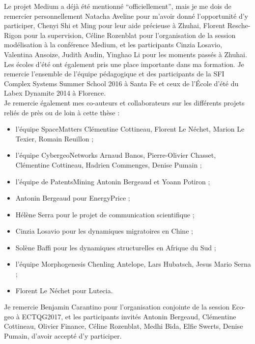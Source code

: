 Le projet Medium a déjà été mentionné ``officiellement'', mais je me dois de remercier personnellement Natacha Aveline pour m'avoir donné l'opportunité d'y participer, Chenyi Shi et Ming pour leur aide précieuse à Zhuhai, Florent Resche-Rigon pour la supervision, Céline Rozenblat pour l'organisation de la session modélisation à la conférence Medium, et les participants Cinzia Losavio, Valentina Ansoize, Judith Audin, Yinghao Li pour les moments passés à Zhuhai.\\



Les écoles d'été ont également pris une place importante dans ma formation. Je remercie l'ensemble de l'équipe pédagogique et des participants de la SFI Complex Systems Summer School 2016 à Santa Fe et ceux de l'École d'été du Labex Dynamite 2014 à Florence.\\





Je remercie également mes co-auteurs et collaborateurs sur les différents projets reliés de près ou de loin à cette thèse :
\begin{itemize}
	\item l'équipe SpaceMatters Clémentine Cottineau, Florent Le Néchet, Marion Le Texier, Romain Reuillon ;
	\item l'équipe CybergeoNetworks Arnaud Banos, Pierre-Olivier Chasset, Clémentine Cottineau, Hadrien Commenges, Denise Pumain ;
	\item l'équipe de PatentsMining Antonin Bergeaud et Yoann Potiron ;
	\item Antonin Bergeaud pour EnergyPrice ;
	\item Hélène Serra pour le projet de communication scientifique ;
	\item Cinzia Losavio pour les dynamiques migratoires en Chine ;
	\item Solène Baffi pour les dynamiques structurelles en Afrique du Sud ;
	\item l'équipe Morphogenesis Chenling Antelope, Lars Hubatsch, Jesus Mario Serna ;
	\item Florent Le Néchet pour Lutecia.
\end{itemize}

Je remercie Benjamin Carantino pour l'organisation conjointe de la session Eco-geo à ECTQG2017, et les participants invités Antonin Bergeaud, Clémentine Cottineau, Olivier Finance, Céline Rozenblat, Medhi Bida, Elfie Swerts, Denise Pumain, d'avoir accepté d'y participer.

